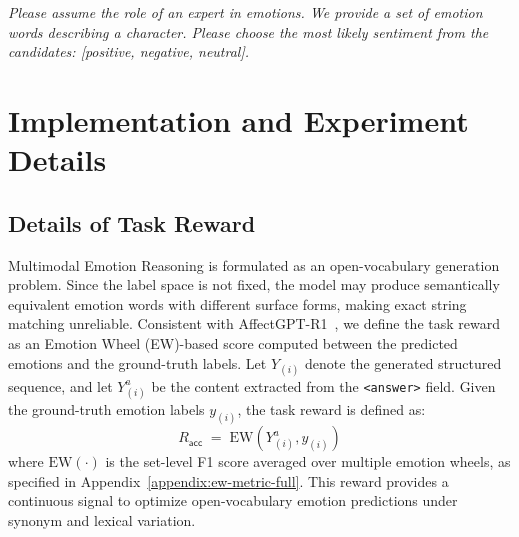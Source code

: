 \documentclass{article}
\theoremstyle{plain}
\theoremstyle{definition}
\theoremstyle{remark}
\begin{document}
\begin{tcolorbox}[
    colback=blue!3,                 %
    colframe=blue!33!black,         %
    colbacktitle=blue!9,           %
    coltitle=black,                 %
    arc=2mm,
    auto outer arc,
    boxrule=0.35mm,
    left=3mm,
    right=3mm,
    top=2mm,
    bottom=2mm,
    width=\textwidth,
    title=\centering \textbf{Sentiment Mapping Prompt}
]
\textit{
Please assume the role of an expert in emotions. We provide a set of emotion words describing a character.
Please choose the most likely sentiment from the candidates: [positive, negative, neutral].
}
\end{tcolorbox}












\section{Implementation and Experiment Details}

\subsection{Details of Task Reward}
\label{sec:task-reward}

Multimodal Emotion Reasoning is formulated as an open-vocabulary generation problem.
Since the label space is not fixed, the model may produce semantically equivalent emotion words with different surface forms, making exact string matching unreliable.
Consistent with AffectGPT-R1~\cite{lian2025affectgptr1}, we define the task reward as an Emotion Wheel (EW)-based score computed between the predicted emotions and the ground-truth labels.
Let $Y_{(i)}$ denote the generated structured sequence, and let $Y_{(i)}^{a}$ be the content extracted from the \texttt{<answer>} field.
Given the ground-truth emotion labels $y_{(i)}$, the task reward is defined as:
\begin{equation}
R_{\mathsf{acc}} \;=\; \mathrm{EW}(Y_{(i)}^{a}, y_{(i)})
\end{equation}
where $\mathrm{EW}(\cdot)$ is the set-level F1 score averaged over multiple emotion wheels, as specified in Appendix~\ref{appendix:ew-metric-full}.
This reward provides a continuous signal to optimize open-vocabulary emotion predictions under synonym and lexical variation.
\end{document}
